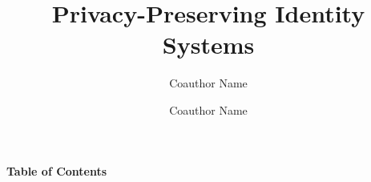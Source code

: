 \documentclass[envcountsame,runningheads,notitlepage]{llncs}
\begin{document}
\renewcommand{\thetheorem}{\thechapter.\arabic{theorem}}
\renewcommand{\thedefinition}{\thechapter.\arabic{definition}}
\renewcommand{\thelemma}{\thechapter.\arabic{lemma}}
\renewcommand{\theproposition}{\thechapter.\arabic{proposition}}
\renewcommand{\thecorollary}{\thechapter.\arabic{corollary}}
\renewcommand{\theexample}{\thechapter.\arabic{example}}
\renewcommand{\theremark}{\thechapter.\arabic{remark}}


  


\title{Privacy-Preserving Identity Systems}

\ifnum{}
\author{
  Coauthor Name \and
  Coauthor Name
}%


\else
\author{} 
\institute{}
\fi


  

    
  
  
  

\makeatletter
\renewcommand\tableofcontents{%
  \clearpage %
  \vspace*{2cm} %
  {\centering\Huge\bfseries Table of Contents\par} %
  \vspace{2em} %
}
\makeatother

\tableofcontents

  
  \listoffigures
  
  
  
  
  
  
  
  


\ifnum{}
  
 \else
   
 \fi
 
\end{document}
